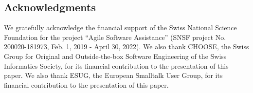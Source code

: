 \documentclass[runningheads]{llncs}
\begin{document}
\subsection*{Acknowledgments}
We gratefully acknowledge the financial support of the Swiss National Science Foundation for the project
``Agile Software Assistance'' (SNSF project No. 200020-181973, Feb. 1, 2019 - April 30, 2022).
We also thank CHOOSE, the Swiss Group for Original and Outside-the-box Software Engineering of the Swiss Informatics Society, for its financial contribution to the presentation of this paper.
We also thank ESUG, the European Smalltalk User Group, for its financial contribution to the presentation of this paper.


% 
% 
% 
\end{document}

